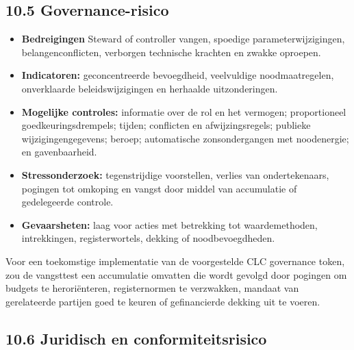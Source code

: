 \documentclass[11pt]{article}
\begin{document}
\subsection*{10.5 Governance-risico}

\begin{itemize}[leftmargin=*]
\item \textbf{Bedreigingen} Steward of controller vangen, spoedige parameterwijzigingen, belangenconflicten, verborgen technische krachten en zwakke oproepen.
\item \textbf{Indicatoren:} geconcentreerde bevoegdheid, veelvuldige noodmaatregelen, onverklaarde beleidswijzigingen en herhaalde uitzonderingen.
\item \textbf{Mogelijke controles:} informatie over de rol en het vermogen; proportioneel goedkeuringsdrempels; tijden; conflicten en afwijzingsregels; publieke wijzigingengegevens; beroep; automatische zonsondergangen met noodenergie; en gavenbaarheid.
\item \textbf{Stressonderzoek:} tegenstrijdige voorstellen, verlies van ondertekenaars, pogingen tot omkoping en vangst door middel van accumulatie of gedelegeerde controle.
\item \textbf{Gevaarsheten:} laag voor acties met betrekking tot waardemethoden, intrekkingen, registerwortels, dekking of noodbevoegdheden.
\end{itemize}
Voor een toekomstige implementatie van de voorgestelde CLC governance token, zou de vangsttest een accumulatie omvatten die wordt gevolgd door pogingen om budgets te heroriënteren, registernormen te verzwakken, mandaat van gerelateerde partijen goed te keuren of gefinancierde dekking uit te voeren.

\subsection*{10.6 Juridisch en conformiteitsrisico}
\end{document}
